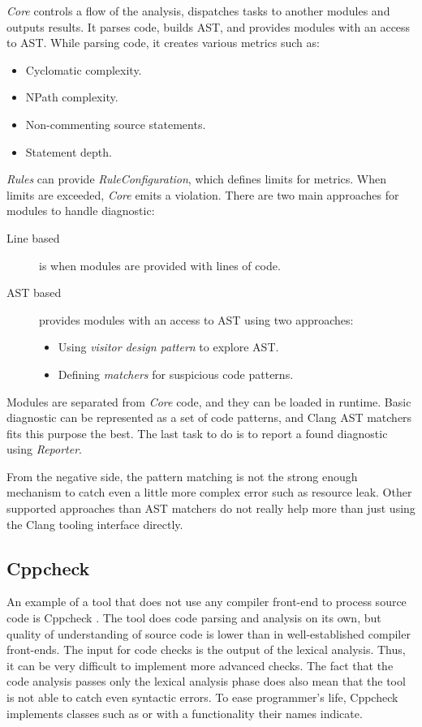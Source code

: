 \emph{Core} controls a flow of the analysis, dispatches tasks to another modules and outputs results. It parses code, builds AST, and provides modules with an access to AST. While parsing code, it creates various metrics such as:

\begin{itemize}
\item Cyclomatic complexity.
\item NPath complexity.
\item Non-commenting source statements.
\item Statement depth.
\end{itemize}

\emph{Rules} can provide \emph{RuleConfiguration}, which defines limits for metrics. When limits are exceeded, \emph{Core} emits a violation. There are two main approaches for modules to handle diagnostic:

\begin{description}
\item[Line based] is when modules are provided with lines of code.
\item[AST based] provides modules with an access to AST using two approaches:
	\begin{itemize}
	\item Using \emph{visitor design pattern} to explore AST.
	\item Defining \emph{matchers} for suspicious code patterns.
	\end{itemize}
\end{description}

Modules are separated from \emph{Core} code, and they can be loaded in runtime. Basic diagnostic can be represented as a set of code patterns, and Clang AST matchers fits this purpose the best. The last task to do is to report a found diagnostic using \emph{Reporter}.

From the negative side, the pattern matching is not the strong enough mechanism to catch even a little more complex error such as resource leak. Other supported approaches than AST matchers do not really help more than just using the Clang tooling interface directly.

\subsection{Cppcheck}
An example of a tool that does not use any compiler front-end to process source code is Cppcheck \cite{cppcheck}. The tool does code parsing and analysis on its own, but quality of understanding of source code is lower than in well-established compiler front-ends. The input for code checks is the output of the lexical analysis. Thus, it can be very difficult to implement more advanced checks. The fact that the code analysis passes only the lexical analysis phase does also mean that the tool is not able to catch even syntactic errors. To ease programmer's life, Cppcheck implements classes such as  or  with a functionality their names indicate.

